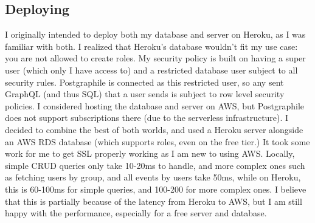\documentclass{l4proj}
\begin{document}
\subsection{Deploying}
I originally intended to deploy both my database and server on Heroku, as I was familiar with both. I realized that Heroku's database wouldn't fit my use case: you are not allowed to create roles. My security policy is built on having a super user (which only I have access to) and a restricted database user subject to all security rules. Postgraphile is connected as this restricted user, so any sent GraphQL (and thus SQL) that a user sends is subject to row level security policies. I considered hosting the database and server on AWS, but Postgraphile does not support subscriptions there (due to the serverless infrastructure). I decided to combine the best of both worlds, and used a Heroku server alongside an AWS RDS database (which supports roles, even on the free tier.) It took some work for me to get SSL properly working as I am new to using AWS. Locally, simple CRUD queries only take 10-20ms to handle, and more complex ones such as fetching users by group, and all events by users take 50ms, while on Heroku, this is 60-100ms for simple queries, and 100-200 for more complex ones. I believe that this is partially because of the latency from Heroku to AWS, but I am still happy with the performance, especially for a free server and database.
\end{document}
